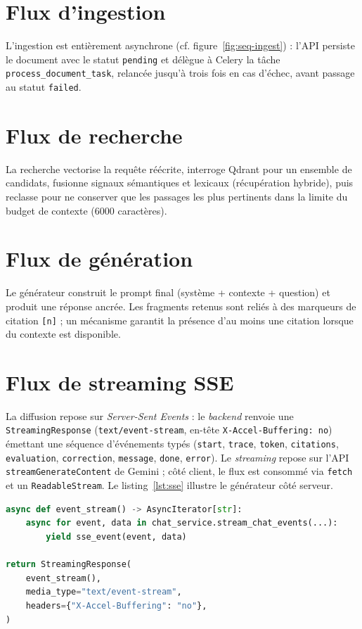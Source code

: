 \section{Flux d'ingestion}
L'ingestion est entièrement asynchrone (cf. figure~\ref{fig:seq-ingest}) : l'API
persiste le document avec le statut \texttt{pending} et délègue à Celery la tâche
\texttt{process\_document\_task}, relancée jusqu'à trois fois en cas d'échec, avant
passage au statut \texttt{failed}.

\section{Flux de recherche}
La recherche vectorise la requête réécrite, interroge Qdrant pour un ensemble de
candidats, fusionne signaux sémantiques et lexicaux (récupération hybride), puis
reclasse pour ne conserver que les passages les plus pertinents dans la limite du
budget de contexte (6000 caractères).

\section{Flux de génération}
Le générateur construit le prompt final (système + contexte + question) et produit
une réponse ancrée. Les fragments retenus sont reliés à des marqueurs de citation
\texttt{[n]} ; un mécanisme garantit la présence d'au moins une citation lorsque
du contexte est disponible.

\section{Flux de streaming SSE}
La diffusion repose sur \emph{Server-Sent Events} : le \emph{backend} renvoie une
\texttt{StreamingResponse} (\texttt{text/event-stream}, en-tête
\texttt{X-Accel-Buffering: no}) émettant une séquence d'événements typés
(\texttt{start}, \texttt{trace}, \texttt{token}, \texttt{citations},
\texttt{evaluation}, \texttt{correction}, \texttt{message}, \texttt{done},
\texttt{error}). Le \emph{streaming} repose sur l'API \texttt{streamGenerateContent}
de Gemini ; côté client, le flux est consommé via \texttt{fetch} et un
\texttt{ReadableStream}. Le listing~\ref{lst:sse} illustre le générateur côté
serveur.

\begin{lstlisting}[style=code,language=Python,caption={Génération du flux SSE (extrait)},label={lst:sse}]
async def event_stream() -> AsyncIterator[str]:
    async for event, data in chat_service.stream_chat_events(...):
        yield sse_event(event, data)

return StreamingResponse(
    event_stream(),
    media_type="text/event-stream",
    headers={"X-Accel-Buffering": "no"},
)
\end{lstlisting}

